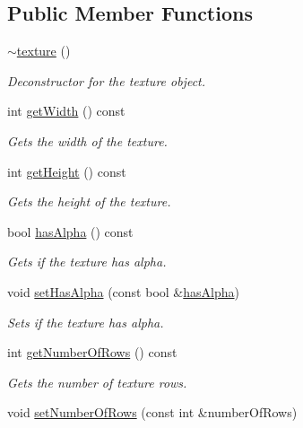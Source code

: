 \subsection*{Public Member Functions}
\begin{DoxyCompactItemize}
\item 
\hyperlink{classflounder_1_1texture_a8271c7f9860a5a235be9b1207bed2c39}{$\sim$texture} ()
\begin{DoxyCompactList}\small\item\em Deconstructor for the texture object. \end{DoxyCompactList}\item 
int \hyperlink{classflounder_1_1texture_af4502c9224b20f452b25918dbaaa2d3a}{get\+Width} () const
\begin{DoxyCompactList}\small\item\em Gets the width of the texture. \end{DoxyCompactList}\item 
int \hyperlink{classflounder_1_1texture_a88b654180956109a0508c41eb907fa75}{get\+Height} () const
\begin{DoxyCompactList}\small\item\em Gets the height of the texture. \end{DoxyCompactList}\item 
bool \hyperlink{classflounder_1_1texture_aa74c0c1cb920f5f131832ec6498eba47}{has\+Alpha} () const
\begin{DoxyCompactList}\small\item\em Gets if the texture has alpha. \end{DoxyCompactList}\item 
void \hyperlink{classflounder_1_1texture_ac05209e3a9686903a336575ac71b8f0e}{set\+Has\+Alpha} (const bool \&\hyperlink{classflounder_1_1texture_aa74c0c1cb920f5f131832ec6498eba47}{has\+Alpha})
\begin{DoxyCompactList}\small\item\em Sets if the texture has alpha. \end{DoxyCompactList}\item 
int \hyperlink{classflounder_1_1texture_a0f4e7c0e5a644003fced34d4e4125a36}{get\+Number\+Of\+Rows} () const
\begin{DoxyCompactList}\small\item\em Gets the number of texture rows. \end{DoxyCompactList}\item 
void \hyperlink{classflounder_1_1texture_ac0854bbd1a260380db88f378b408aa18}{set\+Number\+Of\+Rows} (const int \&number\+Of\+Rows)

\end{DoxyCompactItemize}
